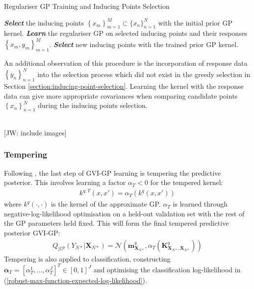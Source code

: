 \documentclass{article}
\newcommand{\jw}[1]{{\color{gray} [JW: #1]}}
\newcommand{\GP}{\operatorname{\mathcal{GP}}}
\numberwithin{equation}{section}
\begin{document}
\begin{algorithm}
\caption{Regulariser GP Training and Inducing Points Selection}\label{alg:gvi-gp}
\begin{algorithmic}
 \State \textbf{\textit{Select}} the inducing points $\left\{x_m\right\}_{m=1}^{M} \subset \{x_n\}_{n=1}^{N}$ with the initial prior GP kernel.
\State \textbf{\textit{Learn}} the regulariser GP on selected inducing points and their responses $\left\{x_m, y_m\right\}_{m=1}^{M}$.
\State  \textbf{\textit{Select}} new inducing points with the trained prior GP kernel.
\EndWhile
\end{algorithmic}
\end{algorithm}
An additional observation of this procedure is the incorporation of response data $\left\{y_n\right\}_{n=1}^N$ into the selection process which did not exist in the greedy selection in Section \ref{section:inducing-point-selection}. Learning the kernel with the response data can give more appropriate covariances when comparing candidate points $\left\{x_n\right\}_{n=1}^N$ during the inducing points selection.

\\\jw{include images}

\subsubsection{Tempering}
Following \cite{wild2022generalized}, the last step of GVI-GP learning is tempering the predictive posterior. This involves learning a factor $\alpha_T < 0$ for the tempered kernel:
\begin{align}
    k^{q, T}(x, x') = \alpha_T \left( k^q(x, x')\right)
\end{align}
where $k^q(\cdot, \cdot)$ is the kernel of the approximate GP. $\alpha_T$ is learned through negative-log-likelihood optimisation on a held-out validation set with the rest of the GP parameters held fixed. This will form the final tempered predictive posterior GVI-GP:
\begin{align}
    Q_{\GP}(Y_{N*} \vert \mathbf{X}_{N*}) = \mathcal{N}\left(\mathbf{m}^q_{\mathbf{X}_{N*}}, \alpha_T \left(\mathbf{K}^q_{\mathbf{X}_{N*}, \mathbf{X}_{N*}}\right)\right)
\end{align}
 Tempering is also applied to classification, constructing $\boldsymbol{\alpha}_T = \left[\alpha_T^1, \dots, \alpha_T^J \right]^T \in [0, 1]^J$ and optimising the classification log-likelihood in (\ref{robust-max-function-expected-log-likelihood}).
\end{document}
